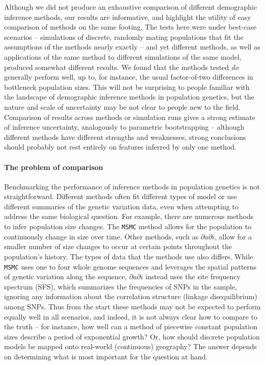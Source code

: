 \documentclass[12pt,halfline,a4paper]{ouparticle}
\newcommand{\dadi}{$\partial a \partial i$\xspace}
\newcommand{\MSMC}{\texttt{MSMC}\xspace}
\newcommand{\adk}[1]{\textcolor{red}{ADK: #1}}
\begin{document}
Although we did not produce an exhaustive comparison of different demographic inference methods,
our results are informative,
and highlight the utility of easy comparison of methods on the same footing.
The tests here were under best-case scenarios --
simulations of discrete, randomly mating populations that fit the assumptions of the methods nearly exactly --
and yet different methods, as well as applications of the same method
to different simulations of the same model,
produced somewhat different results.
We found that the methods tested \emph{do} generally perform well,
up to, for instance, the usual factor-of-two differences in bottleneck population sizes.
This will not be surprising to people familiar with the landscape of
demographic inference methods in population genetics,
but the nature and scale of uncertainty may be not clear to people new to the field.
Comparison of results across methods or simulation runs
gives a strong estimate of inference uncertainty, analogously to parametric bootstrapping --
although different methods have different strengths and weaknesses,
strong conclusions should probably not rest entirely on features inferred by only one method.




\paragraph{The problem of comparison} %
Benchmarking the performance of inference methods in population genetics is not straightforward.
Different methods often fit different types of model
or use different summaries of the genetic variation data, even when
attempting to address the same biological question. For example, there are
numerous methods to infer population size changes.
The \MSMC method \citep{schiffels2014inferring} allows for the
population to continuously change in size over time. Other methods, such as
\dadi \citep{gutenkunst2009inferring}, allow for a smaller number of size changes to occur at certain
points throughout the population's history. The types of data that the
methods use also differs. While \MSMC uses one to four whole genome sequences and leverages the
spatial patterns of genetic variation along the sequence, \dadi  instead uses the
site frequency spectrum (SFS), which summarizes the frequencies of SNPs in the
sample, ignoring any information about the correlation structure (linkage
disequilibrium) among SNPs. Thus from the start these methods may not be
expected to perform equally well in all scenarios,
and indeed, it is not always clear how to compare to the truth --
for instance, how well can a method of piecewise constant population sizes
describe a period of exponential growth?
Or, how should discrete population models be mapped onto real-world (continuous) geography?
The answer depends on determining what is most important for the question at hand.
\end{document}
